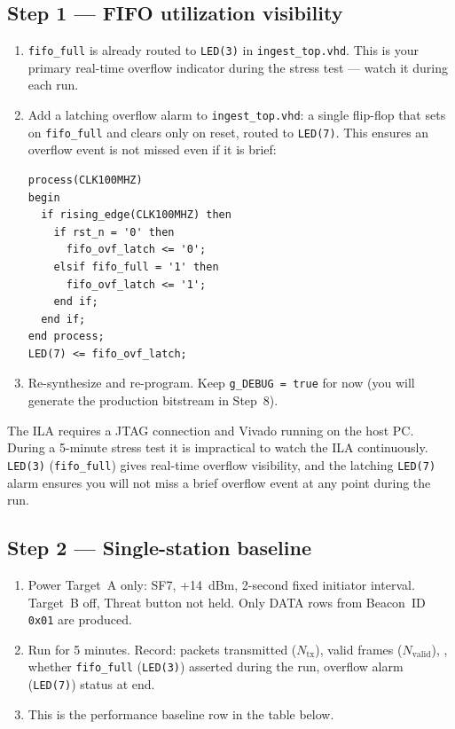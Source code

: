 \documentclass[11pt,letterpaper]{article}
\begin{document}
\subsection{Step 1 --- FIFO utilization visibility}
\begin{enumerate}[leftmargin=2em]
	\item \texttt{fifo\_full} is already routed to \texttt{LED(3)} in \texttt{ingest\_top.vhd}. This is your primary real-time overflow indicator during the stress test --- watch it during each run.
	\item Add a latching overflow alarm to \texttt{ingest\_top.vhd}: a single flip-flop that sets on \texttt{fifo\_full} and clears only on reset, routed to \texttt{LED(7)}. This ensures an overflow event is not missed even if it is brief:
\begin{verbatim}
process(CLK100MHZ)
begin
  if rising_edge(CLK100MHZ) then
    if rst_n = '0' then
      fifo_ovf_latch <= '0';
    elsif fifo_full = '1' then
      fifo_ovf_latch <= '1';
    end if;
  end if;
end process;
LED(7) <= fifo_ovf_latch;
\end{verbatim}
	\item Re-synthesize and re-program. Keep \texttt{g\_DEBUG = true} for now (you will generate the production bitstream in Step~8).
\end{enumerate}

\begin{tcolorbox}[infobox={Why Map FIFO to LEDs?}]
	The \mbox{ILA{}} requires a JTAG connection and Vivado running on the host PC. During a 5-minute stress test it is impractical to watch the \mbox{ILA} continuously. \texttt{LED(3)} (\texttt{fifo\_full}) gives real-time overflow visibility, and the latching \texttt{LED(7)} alarm ensures you will not miss a brief overflow event at any point during the run.
\end{tcolorbox}

\subsection{Step 2 --- Single-station baseline}
\begin{enumerate}[leftmargin=2em]
	\item Power Target~A only: SF7, +14~dBm, 2-second fixed initiator interval. Target~B off, Threat button not held. Only DATA rows from Beacon~ID \texttt{0x01} are produced.
	\item Run for 5 minutes. Record: packets transmitted ($N_{\text{tx}}$), \FPGA{} valid frames ($N_{\text{valid}}$), \PER{}, whether \texttt{fifo\_full} (\texttt{LED(3)}) asserted during the run, overflow alarm (\texttt{LED(7)}) status at end.
	\item This is the performance baseline row in the table below.
\end{enumerate}
\end{document}
